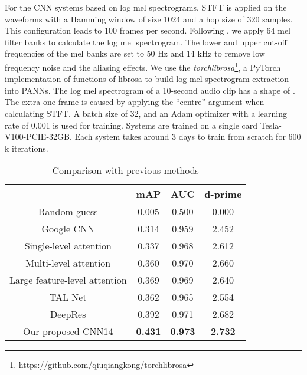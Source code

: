 \documentclass[journal]{IEEEtran}
\begin{document}
For the CNN systems based on log mel spectrograms, STFT is applied on the waveforms with a Hamming window of size 1024 \cite{kong2019cross} and a hop size of 320 samples. This configuration leads to 100 frames per second. Following \cite{kong2019cross}, we apply 64 mel filter banks to calculate the log mel spectrogram. The lower and upper cut-off frequencies of the mel banks are set to 50 Hz and 14 kHz to remove low frequency noise and the aliasing effects. We use the \textit{torchlibrosa}\footnote{\url{https://github.com/qiuqiangkong/torchlibrosa}}, a PyTorch implementation of functions of librosa \cite{mcfee2015librosa} to build log mel spectrogram extraction into PANNs. The log mel spectrogram of a 10-second audio clip has a shape of . The extra one frame is caused by 
applying the ``centre'' argument when calculating STFT. A batch size of 32, and an Adam \cite{kingma2014adam} optimizer with a learning rate of 0.001 is used for training. Systems are trained on a single card Tesla-V100-PCIE-32GB. Each system takes around 3 days to train from scratch for 600 k iterations.



\begin{table}[t]
\centering
\caption{Comparison with previous methods}
\label{table:comparison}
\begin{tabular}{*{4}{c}}
 \toprule
 & mAP & AUC & d-prime \\
 \midrule
 Random guess & 0.005 & 0.500 & 0.000 \\
 Google CNN \cite{gemmeke2017audio} & 0.314 & 0.959 & 2.452 \\
 Single-level attention \cite{kong2018audio} & 0.337 & 0.968 & 2.612 \\
 Multi-level attention \cite{yu2018multi} & 0.360 & 0.970 & 2.660 \\
 Large feature-level attention \cite{kong2019weakly} & 0.369 & 0.969 & 2.640 \\
 TAL Net \cite{wang2019comparison} & 0.362 & 0.965 & 2.554 \\
 DeepRes \cite{ford2019deep} & 0.392 & 0.971 & 2.682 \\
 \midrule
 Our proposed CNN14 & \textbf{0.431} & \textbf{0.973} & \textbf{2.732} \\
 \bottomrule
\end{tabular}
\end{table}
\end{document}
